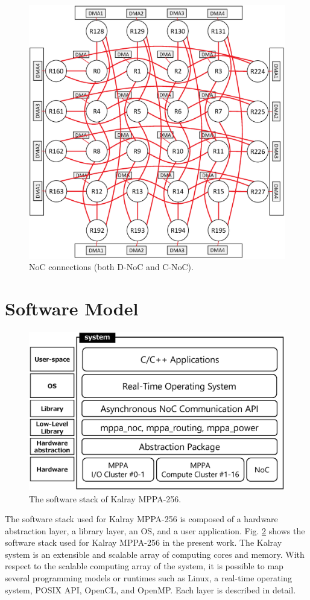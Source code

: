 \begin{figure}[H]
  \centering
  \includegraphics[width=0.7\linewidth]{../figure/noc_map.eps}
      \caption{\label{fig:noc_map}
    NoC connections (both D-NoC and C-NoC).}
\end{figure}

\section{Software Model}
\label{sec:software_model}

\begin{figure}[!htbp]
  \centering
  \includegraphics[width=0.7\linewidth]{../figure/softwarestack.eps}   
  \caption{\label{fig:software_stack}
    The software stack of Kalray MPPA-256.}     
\end{figure}

The software stack used for Kalray MPPA-256 is composed of a hardware abstraction layer, a library layer, an OS, and a user application.  
Fig. \ref{fig:software_stack} shows the software stack used for Kalray MPPA-256 in the present work.
The Kalray system is an extensible and scalable array of computing cores and memory.
With respect to the scalable computing array of the system, it is possible to map several programming models or runtimes such as Linux, a real-time operating system, POSIX API, OpenCL, and OpenMP.
Each layer is described in detail.

